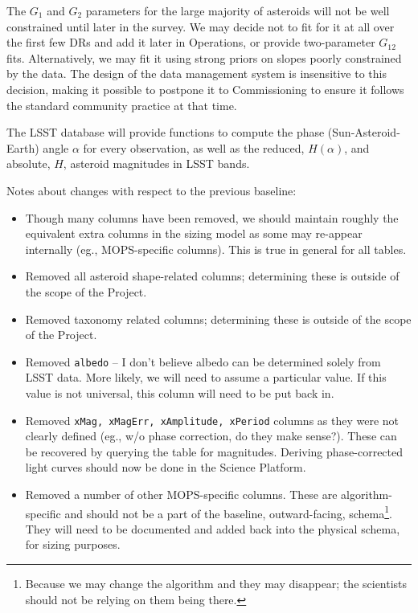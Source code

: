 \documentclass[SE,lsstdraft,toc]{lsstdoc}
\begin{document}
The $G_1$ and $G_2$ parameters for the large majority of asteroids will not be well constrained until later in the survey. We may decide not to fit for it at all over the first few DRs and add it later in Operations, or provide two-parameter $G_{12}$ fits. Alternatively, we may fit it using strong priors on slopes poorly constrained by the data. The design of the data management system is insensitive to this decision, making it possible to postpone it to Commissioning to ensure it follows the standard community practice at that time.

The LSST database will provide functions to compute the phase (Sun-Asteroid-Earth) angle $\alpha$ for every observation, as well as the reduced, $H(\alpha)$, and absolute, $H$, asteroid magnitudes in LSST bands.

\begin{changelog}
Notes about changes with respect to the previous baseline:
\begin{itemize}
    \item Though many columns have been removed, we should maintain roughly the equivalent extra columns in the sizing model as some may re-appear internally (eg., MOPS-specific columns). This is true in general for all tables.
    \item Removed all asteroid shape-related columns; determining these is outside of the scope of the Project.
    \item Removed taxonomy related columns; determining these is outside of the scope of the Project.
    \item Removed \texttt{albedo} -- I don't believe albedo can be determined solely from LSST data. More likely, we will need to assume a particular value. If this value is not universal, this column will need to be put back in.
    \item Removed \texttt{xMag, xMagErr, xAmplitude, xPeriod} columns as they were not clearly defined (eg., w/o phase correction, do they make sense?). These can be recovered by querying the \DIASource table for magnitudes. Deriving phase-corrected light curves should now be done in the Science Platform.
    \item Removed a number of other MOPS-specific columns. These are algorithm-specific and should not be a part of the baseline, outward-facing, schema\footnote{Because we may change the algorithm and they may disappear; the scientists should not be relying on them being there.}. They will need to be documented and added back into the physical schema, for sizing purposes.
\end{itemize}
\end{changelog}
\end{document}
